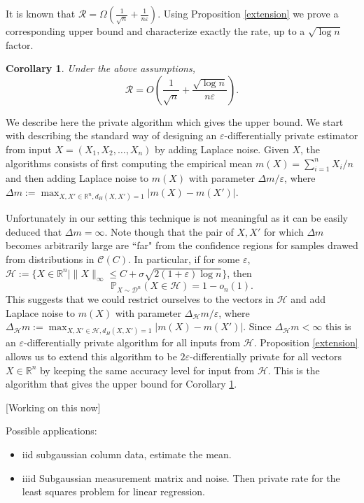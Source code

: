 \documentclass[12pt,a4paper]{article}
\numberwithin{equation}{section}
\newtheorem{corollary}[theorem]{Corollary}
\numberwithin{equation}{section}
\renewcommand{\epsilon}{\varepsilon}
\newcommand{\1}{{\text{\Large $\mathfrak 1$}}}
\newcommand{\2}[1]{{\text{\Large $\mathfrak 1$}\!\left(#1\right)}}
\begin{document}
It is known that $\mathcal{R} = \Omega\left( \frac{1}{\sqrt{n}}+ \frac{1}{n \epsilon} \right).$ Using Proposition \ref{extension} we prove a corresponding upper bound and characterize exactly the rate, up to a $\sqrt{\log n}$ factor.
\begin{corollary}\label{cor1}
Under the above assumptions, $$\mathcal{R} = O\left( \frac{1}{\sqrt{n}}+ \frac{\sqrt{\log n}}{n \epsilon} \right).$$
\end{corollary}


We describe here the private algorithm which gives the upper bound. We start with describing the standard way of designing an $\epsilon$-differentially private estimator from input $X=(X_1,X_2,\ldots,X_n)$ by adding Laplace noise. Given $X$, the algorithms consists of first computing the empirical mean $m(X)=\sum_{i=1}^n X_i/n$ and then adding Laplace noise to $m(X)$ with parameter $\Delta m / \epsilon$, where $\Delta m:=\max_{X,X'\in \mathbb{R}^n,d_H(X,X')=1} | m(X)-m(X')|$.


Unfortunately in our setting this technique is not meaningful as it can be easily deduced that $\Delta m=\infty$. Note though that the pair of $X,X'$ for which $\Delta m$ becomes arbitrarily large are ``far" from the confidence regions for samples drawed from distributions in $\mathcal{C}\left(C\right)$. In particular, if for some $\epsilon$, $\mathcal{H}:=\{X \in \mathbb{R}^n | \|X\|_{\infty} \leq C+\sigma \sqrt{2(1+\epsilon) \log n}\}$, then $$\mathbb{P}_{X \sim \mathcal{D}^n} \left( X \in \mathcal{H}\right) =1-o_n(1).$$This suggests that we could restrict ourselves to the vectors in $\mathcal{H}$ and add Laplace noise to $m(X)$ with parameter $\Delta_{\mathcal{H}} m / \epsilon$, where $\Delta_{\mathcal{H}} m:=\max_{X,X'\in \mathcal{H},d_H(X,X')=1} | m(X)-m(X')|$. Since $\Delta_{\mathcal{H}} m< \infty$ this is an $\epsilon$-differentially private algorithm for all inputs from $\mathcal{H}$. Proposition \ref{extension} allows us to extend this algorithm to be $2 \epsilon$-differentially private for all vectors $X \in \mathbb{R}^n$ by keeping the same accuracy level for input from $\mathcal{H}$. This is the algorithm that gives the upper bound for Corollary \ref{cor1}.


[Working on this now]

Possible applications:
\begin{itemize}
\item iid subgaussian column data, estimate the mean.

\item iiid Subgaussian measurement matrix and noise. Then private rate for the least squares problem for linear regression.
\end{itemize}
\end{document}
